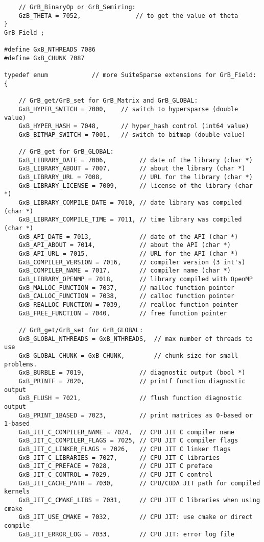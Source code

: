 {\begin{verbatim}
    // GrB_BinaryOp or GrB_Semiring:
    GzB_THETA = 7052,               // to get the value of theta
}
GrB_Field ;

#define GxB_NTHREADS 7086
#define GxB_CHUNK 7087

typedef enum            // more SuiteSparse extensions for GrB_Field:
{

    // GrB_get/GrB_set for GrB_Matrix and GrB_GLOBAL:
    GxB_HYPER_SWITCH = 7000,    // switch to hypersparse (double value)
    GxB_HYPER_HASH = 7048,      // hyper_hash control (int64 value)
    GxB_BITMAP_SWITCH = 7001,   // switch to bitmap (double value)

    // GrB_get for GrB_GLOBAL:
    GxB_LIBRARY_DATE = 7006,         // date of the library (char *)
    GxB_LIBRARY_ABOUT = 7007,        // about the library (char *)
    GxB_LIBRARY_URL = 7008,          // URL for the library (char *)
    GxB_LIBRARY_LICENSE = 7009,      // license of the library (char *)
    GxB_LIBRARY_COMPILE_DATE = 7010, // date library was compiled (char *)
    GxB_LIBRARY_COMPILE_TIME = 7011, // time library was compiled (char *)
    GxB_API_DATE = 7013,             // date of the API (char *)
    GxB_API_ABOUT = 7014,            // about the API (char *)
    GxB_API_URL = 7015,              // URL for the API (char *)
    GxB_COMPILER_VERSION = 7016,     // compiler version (3 int's)
    GxB_COMPILER_NAME = 7017,        // compiler name (char *)
    GxB_LIBRARY_OPENMP = 7018,       // library compiled with OpenMP
    GxB_MALLOC_FUNCTION = 7037,      // malloc function pointer
    GxB_CALLOC_FUNCTION = 7038,      // calloc function pointer
    GxB_REALLOC_FUNCTION = 7039,     // realloc function pointer
    GxB_FREE_FUNCTION = 7040,        // free function pointer

    // GrB_get/GrB_set for GrB_GLOBAL:
    GxB_GLOBAL_NTHREADS = GxB_NTHREADS,  // max number of threads to use
    GxB_GLOBAL_CHUNK = GxB_CHUNK,        // chunk size for small problems.
    GxB_BURBLE = 7019,               // diagnostic output (bool *)
    GxB_PRINTF = 7020,               // printf function diagnostic output
    GxB_FLUSH = 7021,                // flush function diagnostic output
    GxB_PRINT_1BASED = 7023,         // print matrices as 0-based or 1-based
    GxB_JIT_C_COMPILER_NAME = 7024,  // CPU JIT C compiler name
    GxB_JIT_C_COMPILER_FLAGS = 7025, // CPU JIT C compiler flags
    GxB_JIT_C_LINKER_FLAGS = 7026,   // CPU JIT C linker flags
    GxB_JIT_C_LIBRARIES = 7027,      // CPU JIT C libraries
    GxB_JIT_C_PREFACE = 7028,        // CPU JIT C preface
    GxB_JIT_C_CONTROL = 7029,        // CPU JIT C control
    GxB_JIT_CACHE_PATH = 7030,       // CPU/CUDA JIT path for compiled kernels
    GxB_JIT_C_CMAKE_LIBS = 7031,     // CPU JIT C libraries when using cmake
    GxB_JIT_USE_CMAKE = 7032,        // CPU JIT: use cmake or direct compile
    GxB_JIT_ERROR_LOG = 7033,        // CPU JIT: error log file


\end{verbatim}}
